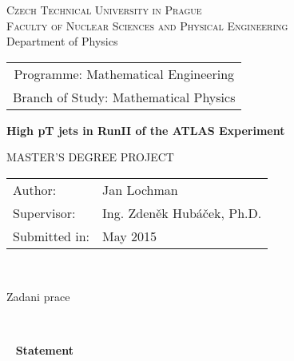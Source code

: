 \documentclass[a4paper,11pt,twoside,openright]{report}
\newcommand{\cvut}{Czech Technical University in Prague}
\newcommand{\fjfi}{Faculty of Nuclear Sciences and Physical Engineering}
\newcommand{\km}{Department of Physics}
\newcommand{\obor}{Mathematical Engineering}
\newcommand{\zamereni}{Mathematical Physics}
\newcommand{\nazeven}{High pT jets in RunII of the ATLAS Experiment}
\newcommand{\autor}{Jan Lochman}
\newcommand{\rok}{May 2015}
\newcommand{\vedouci}{Ing. Zden\v{e}k Hub\'{a}\v{c}ek, Ph.D.}
\begin{document}
\thispagestyle{empty}

\begin{center}
    {\Large \textsc{\cvut}\\[1.5ex] \textsc{\fjfi}}\\[1.5ex]{\large \textsc \km}
    \vspace{10mm}

    \begin{tabular}{c}
    {Programme: \obor}\\
    {Branch of Study: \zamereni}
    \end{tabular}

    \vspace{10mm} \epsfysize=25mm  \epsfysize=25mm  \vspace{15mm}

   {\huge \bf \nazeven}

   \vspace{15mm}
   {\Large MASTER'S DEGREE PROJECT}

   \vfill
   {\large
    \begin{tabular}{ll}
    Author: & \autor\\
    Supervisor: & \vedouci\\
    Submitted in: & \rok
    \end{tabular}
   }
\end{center}


\newpage  
\thispagestyle{empty} 
~


\newpage  
\thispagestyle{empty} 
Zadani prace


\newpage  
\thispagestyle{empty} 
~


\newpage 
\thispagestyle{empty}  
~
\vfill 
{\bf Statement} 
\end{document}
